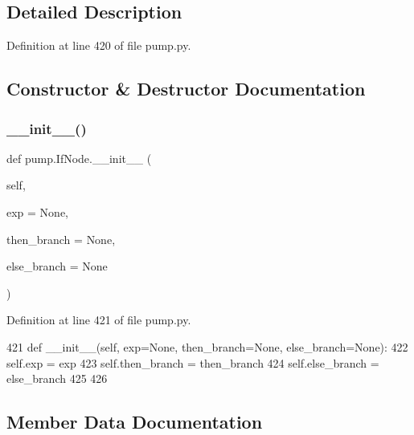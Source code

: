 \subsection{Detailed Description}


Definition at line 420 of file pump.\+py.



\subsection{Constructor \& Destructor Documentation}
\mbox{\label{classpump_1_1IfNode_ab8bff21c18d60b461f7b6fa9dfa59f7c}} 
\subsubsection{\texorpdfstring{\+\_\+\+\_\+init\+\_\+\+\_\+()}{\_\_init\_\_()}}
{\footnotesize\ttfamily def pump.\+If\+Node.\+\_\+\+\_\+init\+\_\+\+\_\+ (\begin{DoxyParamCaption}\item[{}]{self,  }\item[{}]{exp = {\ttfamily None},  }\item[{}]{then\+\_\+branch = {\ttfamily None},  }\item[{}]{else\+\_\+branch = {\ttfamily None} }\end{DoxyParamCaption})}



Definition at line 421 of file pump.\+py.


\begin{DoxyCode}
421   \textcolor{keyword}{def }\_\_init\_\_(self, exp=None, then\_branch=None, else\_branch=None):
422     self.exp = exp
423     self.then\_branch = then\_branch
424     self.else\_branch = else\_branch
425 
426 
\end{DoxyCode}


\subsection{Member Data Documentation}
\mbox{\label{classpump_1_1IfNode_a12e422b16ed4291f15cd95cd6e7f81eb}} 
